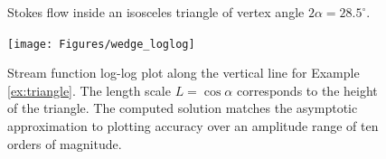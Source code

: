 \begin{example}
\begin{figure}[H]
	\caption{Stokes flow inside an isosceles triangle of vertex angle $2\alpha=28.5^\circ$.}
	\label{fig:wedge}
\end{figure} 
\begin{figure}[H]
	\centering
	\texttt{[image: Figures/wedge\_loglog]}
	\caption{Stream function log-log plot along the vertical line for Example \ref{ex:triangle}. The length scale $L=\cos{\alpha}$ corresponds to the height of the triangle. The computed solution matches the asymptotic approximation to plotting accuracy over an amplitude range of ten orders of magnitude.}
	\label{fig:wedge_loglog}
\end{figure}
\end{example}


